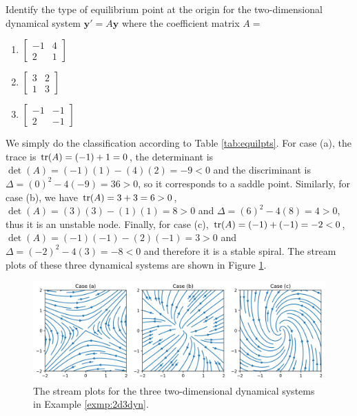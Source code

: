 \begin{exmp}
\label{exmp:2d3dyn}
Identify the type of equilibrium point at the origin for the two-dimensional dynamical system $\textbf{y}' = A\textbf{y}$ where the coefficient matrix $A = $ 
\begin{enumerate}[label=(\alph*)]
    \item $\begin{bmatrix}
    -1 & 4 \\
    2 & 1
    \end{bmatrix}$
    \item $\begin{bmatrix}
    3 & 2 \\
    1 & 3
    \end{bmatrix}$
    \item $\begin{bmatrix}
    -1 & -1 \\
    2 & -1
    \end{bmatrix}$
\end{enumerate}
\end{exmp}
\begin{solution}
We simply do the classification according to Table \ref{tab:equilpts}. For case (a), the trace is $\tr(A) = (-1) + 1 = 0$, the determinant is $\det(A) = (-1)(1) - (4)(2) = -9 < 0$ and the discriminant is $\Delta = (0)^2 - 4(-9) = 36 > 0$, so it corresponds to a saddle point. Similarly, for case (b), we have $\tr(A) = 3 + 3 = 6 > 0$, $\det(A) = (3)(3) - (1)(1) = 8 > 0$ and $\Delta = (6)^2 - 4(8) = 4 > 0$, thus it is an unstable node. Finally, for case (c), $\tr(A) = (-1) + (-1) = -2 < 0$, $\det(A) = (-1)(-1) - (2)(-1) = 3 > 0$ and $\Delta = (-2)^2 - 4(3) = -8 < 0$ and therefore it is a stable spiral. The stream plots of these three dynamical systems are shown in Figure \ref{fig:2d3dyn}. 
\end{solution}

\begin{figure}
    \centering
    \includegraphics[width=\textwidth]{graphics/3exmps2ddynamic.png}
    \caption{The stream plots for the three two-dimensional dynamical systems in Example \ref{exmp:2d3dyn}.}
    \label{fig:2d3dyn}
\end{figure}

